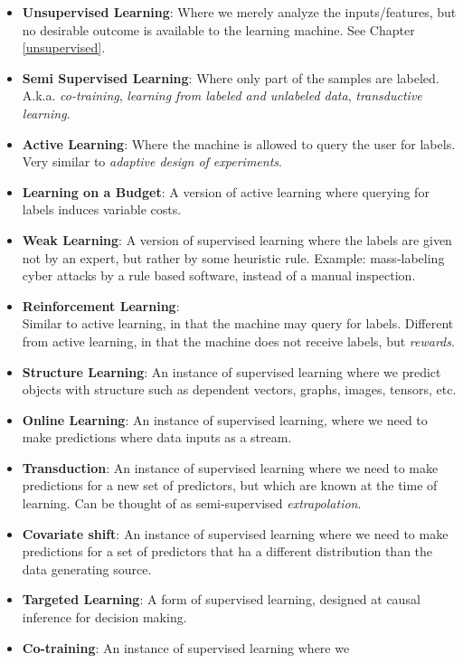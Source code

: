 \documentclass[]{book}
\theoremstyle{definition}
\theoremstyle{definition}
\theoremstyle{definition}
\theoremstyle{remark}
\begin{document}
\begin{itemize}
\item
  \textbf{Unsupervised Learning}: Where we merely analyze the
  inputs/features, but no desirable outcome is available to the learning
  machine. See Chapter \ref{unsupervised}.
\item
  \textbf{Semi Supervised Learning}: Where only part of the samples are
  labeled. A.k.a. \emph{co-training}, \emph{learning from labeled and
  unlabeled data}, \emph{transductive learning}.
\item
  \textbf{Active Learning}: Where the machine is allowed to query the
  user for labels. Very similar to \emph{adaptive design of
  experiments}.
\item
  \textbf{Learning on a Budget}: A version of active learning where
  querying for labels induces variable costs.
\item
  \textbf{Weak Learning}: A version of supervised learning where the
  labels are given not by an expert, but rather by some heuristic rule.
  Example: mass-labeling cyber attacks by a rule based software, instead
  of a manual inspection.
\item
  \textbf{Reinforcement Learning}:\\
  Similar to active learning, in that the machine may query for labels.
  Different from active learning, in that the machine does not receive
  labels, but \emph{rewards}.
\item
  \textbf{Structure Learning}: An instance of supervised learning where
  we predict objects with structure such as dependent vectors, graphs,
  images, tensors, etc.
\item
  \textbf{Online Learning}: An instance of supervised learning, where we
  need to make predictions where data inputs as a stream.
\item
  \textbf{Transduction}: An instance of supervised learning where we
  need to make predictions for a new set of predictors, but which are
  known at the time of learning. Can be thought of as semi-supervised
  \emph{extrapolation}.
\item
  \textbf{Covariate shift}: An instance of supervised learning where we
  need to make predictions for a set of predictors that ha a different
  distribution than the data generating source.
\item
  \textbf{Targeted Learning}: A form of supervised learning, designed at
  causal inference for decision making.
\item
  \textbf{Co-training}: An instance of supervised learning where we

\end{itemize}
\end{document}
